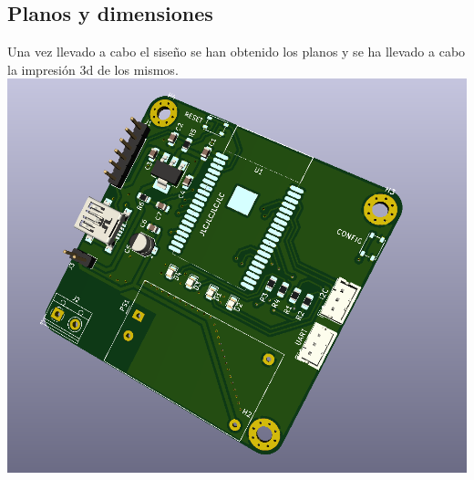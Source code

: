 \documentclass[a4paper ,12pt, onecolumn]{article}
\begin{document}
    \subsection{Planos y dimensiones}
        Una vez llevado a cabo el siseño se han obtenido los planos y se ha llevado a cabo la impresión 3d de los mismos.
        \includegraphics[scale=0.25]{../receiver_1.PNG}
\end{document}
